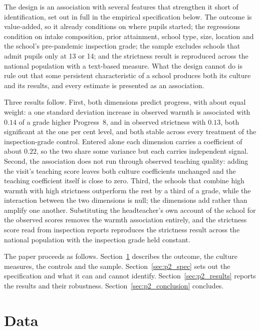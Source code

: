 The design is an association with several features that strengthen it short
of identification, set out in full in the empirical specification below. The
outcome is value-added, so it already conditions on where pupils started; the
regressions condition on intake composition, prior attainment, school type,
size, location and the school's pre-pandemic inspection grade; the sample
excludes schools that admit pupils only at 13 or 14; and the strictness result
is reproduced across the national population with a text-based measure. What
the design cannot do is rule out that some persistent characteristic of a
school produces both its culture and its results, and every estimate is
presented as an association.

Three results follow. First, both dimensions predict progress, with about
equal weight: a one standard deviation increase in observed warmth is
associated with $0.14$ of a grade higher Progress~8, and in observed
strictness with $0.13$, both significant at the one per cent level, and both
stable across every treatment of the inspection-grade control. Entered alone
each dimension carries a coefficient of about $0.22$, so the two share some
variance but each carries independent signal. Second, the association does not
run through observed teaching quality: adding the visit's teaching score
leaves both culture coefficients unchanged and the teaching coefficient
itself is close to zero. Third, the schools that combine high warmth with high
strictness outperform the rest by a third of a grade, while the interaction
between the two dimensions is null; the dimensions add rather than amplify
one another. Substituting the headteacher's own account of the school for the
observed scores removes the warmth association entirely, and the strictness
score read from inspection reports reproduces the strictness result across
the national population with the inspection grade held constant.

The paper proceeds as follows. Section~\ref{sec:p2_data} describes the
outcome, the culture measures, the controls and the sample.
Section~\ref{sec:p2_spec} sets out the specification and what it can and
cannot identify. Section~\ref{sec:p2_results} reports the results and their
robustness. Section~\ref{sec:p2_conclusion} concludes.

\section{Data}
\label{sec:p2_data}


